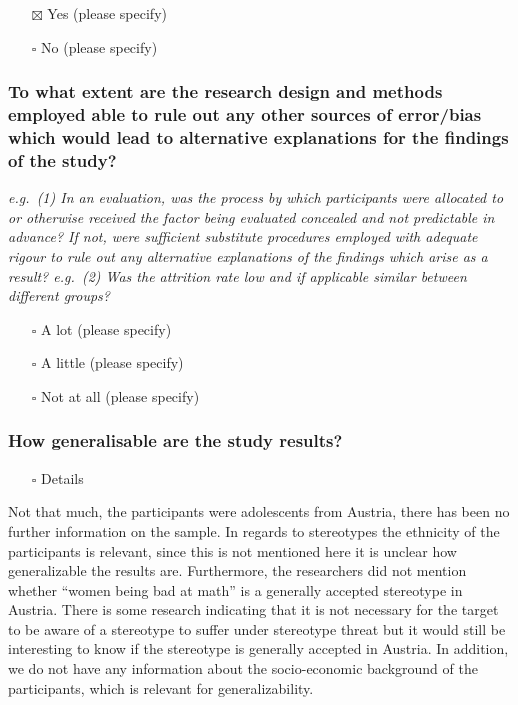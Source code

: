 \documentclass[
  doc, a4paper]{apa7}
\providecommand{\tightlist}{%
  \setlength{\itemsep}{0pt}\setlength{\parskip}{0pt}}
\begin{document}
\begin{itemize}
\tightlist
\item[$\boxtimes$]
  Yes (please specify)
\item[$\square$]
  No (please specify)
\end{itemize}

\subsubsection{To what extent are the research design and methods employed able to rule out any other sources of error/bias which would lead to alternative explanations for the findings of the study?}\label{to-what-extent-are-the-research-design-and-methods-employed-able-to-rule-out-any-other-sources-of-errorbias-which-would-lead-to-alternative-explanations-for-the-findings-of-the-study}

\emph{e.g.~(1) In an evaluation, was the process by which participants were allocated to or otherwise received the factor being evaluated concealed and not predictable in advance? If not, were sufficient substitute procedures employed with adequate rigour to rule out any alternative explanations of the findings which arise as a result? e.g.~(2) Was the attrition rate low and if applicable similar between different groups?}

\begin{itemize}
\tightlist
\item[$\square$]
  A lot (please specify)
\item[$\square$]
  A little (please specify)
\item[$\square$]
  Not at all (please specify)
\end{itemize}

\subsubsection{How generalisable are the study results?}\label{how-generalisable-are-the-study-results}

\begin{itemize}
\tightlist
\item[$\square$]
  Details
\end{itemize}

Not that much, the participants were adolescents from Austria, there has been no further information on the sample. In regards to stereotypes the ethnicity of the participants is relevant, since this is not mentioned here it is unclear how generalizable the results are. Furthermore, the researchers did not mention whether ``women being bad at math'' is a generally accepted stereotype in Austria. There is some research indicating that it is not necessary for the target to be aware of a stereotype to suffer under stereotype threat but it would still be interesting to know if the stereotype is generally accepted in Austria. In addition, we do not have any information about the socio-economic background of the participants, which is relevant for generalizability.
\end{document}

